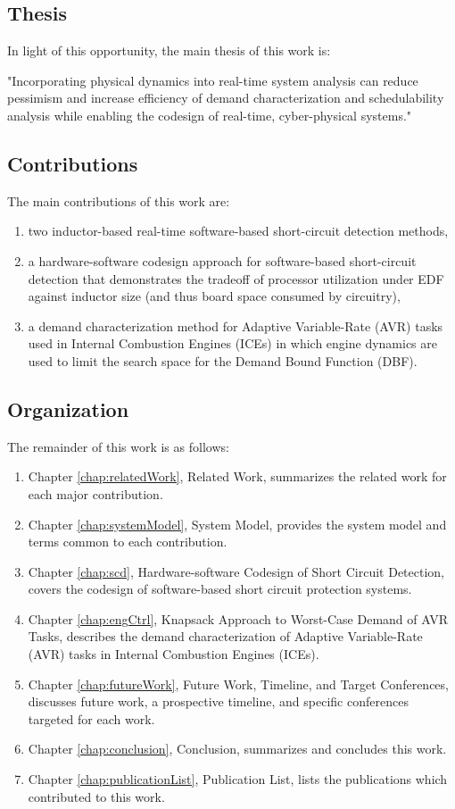 \subsection{Thesis}

In light of this opportunity, the main thesis of this work is:

"Incorporating physical dynamics into real-time system analysis can reduce pessimism and increase efficiency of demand characterization and schedulability analysis while enabling the codesign of real-time, cyber-physical systems." 

\subsection{Contributions}

The main contributions of this work are:
\begin{enumerate}
    \item two inductor-based real-time software-based short-circuit detection methods,
    \item a hardware-software codesign approach for software-based short-circuit detection that demonstrates the tradeoff of processor utilization under EDF against inductor size (and thus board space consumed by circuitry),
    \item a demand characterization method for Adaptive Variable-Rate (AVR) tasks used in Internal Combustion Engines (ICEs) in which engine dynamics are used to limit the search space for the Demand Bound Function (DBF).
\end{enumerate}

\subsection{Organization}

The remainder of this work is as follows:

\begin{enumerate}
    \item Chapter \ref{chap:relatedWork}, Related Work, summarizes the related work for each major contribution.
    \item Chapter \ref{chap:systemModel}, System Model, provides the system model and terms common to each contribution.
    \item Chapter \ref{chap:scd}, Hardware-software Codesign of Short Circuit Detection, covers the codesign of software-based short circuit protection systems.
    \item Chapter \ref{chap:engCtrl}, Knapsack Approach to Worst-Case Demand of AVR Tasks, describes the demand characterization of Adaptive Variable-Rate (AVR) tasks in Internal Combustion Engines (ICEs).
    \item Chapter \ref{chap:futureWork}, Future Work, Timeline, and Target Conferences, discusses future work, a prospective timeline, and specific conferences targeted for each work.
    \item Chapter \ref{chap:conclusion}, Conclusion, summarizes and concludes this work.
    \item Chapter \ref{chap:publicationList}, Publication List, lists the publications which contributed to this work.
\end{enumerate}